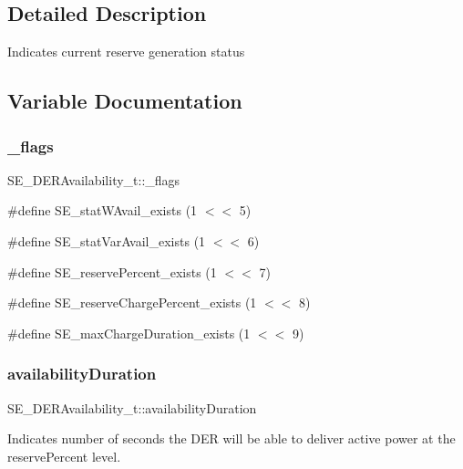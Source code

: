 \subsection{Detailed Description}
Indicates current reserve generation status 

\subsection{Variable Documentation}
\mbox{\label{group__DERAvailability_ga5184b891eb9243cbc337cb66f7afc5d3}} 
\subsubsection{\texorpdfstring{\+\_\+flags}{\_flags}}
{\footnotesize\ttfamily S\+E\+\_\+\+D\+E\+R\+Availability\+\_\+t\+::\+\_\+flags}

\#define S\+E\+\_\+stat\+W\+Avail\+\_\+exists (1 $<$$<$ 5)

\#define S\+E\+\_\+stat\+Var\+Avail\+\_\+exists (1 $<$$<$ 6)

\#define S\+E\+\_\+reserve\+Percent\+\_\+exists (1 $<$$<$ 7)

\#define S\+E\+\_\+reserve\+Charge\+Percent\+\_\+exists (1 $<$$<$ 8)

\#define S\+E\+\_\+max\+Charge\+Duration\+\_\+exists (1 $<$$<$ 9) \mbox{\label{group__DERAvailability_gae081b220b89bb465c0654de559704c68}} 
\subsubsection{\texorpdfstring{availability\+Duration}{availabilityDuration}}
{\footnotesize\ttfamily S\+E\+\_\+\+D\+E\+R\+Availability\+\_\+t\+::availability\+Duration}

Indicates number of seconds the D\+ER will be able to deliver active power at the reserve\+Percent level. \mbox{\label{group__DERAvailability_ga5ae1c571d6750310abb6c25d2c1f9ec1}} 
